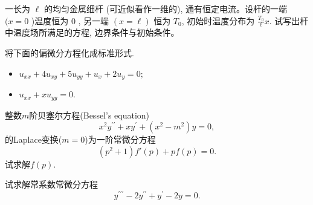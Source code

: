 \documentclass[10pt]{article}
\newenvironment{problem}[2][]{\begin{trivlist}
\item[\hskip \labelsep {\bfseries #1}\hskip \labelsep {\bfseries #2}]}{\end{trivlist}}
\begin{document}
\renewcommand{\labelenumi}{(\arabic{enumi})}
\renewcommand{\labelenumii}{(\arabic{enumi}.\arabic{enumii})}



 




\begin{problem}{8.1}
  一长为 $\ell$ 的均匀金属细杆 (可近似看作一维的), 
  通有恒定电流。设杆的一端 $(x=0$ )温度恒为 0 , 另一端 $(x=\ell)$ 恒为 $T_0$, 
  初始时温度分布为 $\frac{T_0}{\ell} x$.
  试写出杆中温度场所满足的方程, 边界条件与初始条件。
\end{problem}

\vspace{2em}

\begin{problem}{8.2}
 将下面的偏微分方程化成标准形式.
 \begin{itemize}
  \item [(1)] $
  u_{x x}+4 u_{x y}+5 u_{y y}+u_x+2 u_y=0;
  $
  \item [(2)]
  $
  u_{x x}+x u_{y y}=0.
  $


 \end{itemize}

\end{problem}
  

\vspace{2em}

\begin{problem}{8.3}
  整数$m$阶贝塞尔方程(Bessel's equation)
  $$
    x^2 y^{\prime \prime}+x y^{\prime}+\left(x^2-m^2\right) y = 0, 
  $$
的Laplace变换($m = 0$)为一阶常微分方程
  $$
   (p^2 + 1) f'(p) + pf(p) = 0.
  $$
   试求解$f(p)$.
\end{problem}


\vspace{2em}


\begin{problem}{8.4}
试求解常系数常微分方程
$$
y^{\prime \prime \prime}-2 y^{\prime \prime}+y^{\prime}-2 y=0 .
$$
\end{problem}
\end{document}
